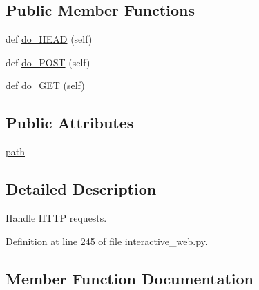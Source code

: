 \subsection*{Public Member Functions}
\begin{DoxyCompactItemize}
\item 
def \hyperlink{classparlai_1_1scripts_1_1interactive__web_1_1MyHandler_a2231328696ebba922f2e5e1d9b8ebb56}{do\+\_\+\+H\+E\+AD} (self)
\item 
def \hyperlink{classparlai_1_1scripts_1_1interactive__web_1_1MyHandler_abea6bbf8b4439489c05a388fa615506c}{do\+\_\+\+P\+O\+ST} (self)
\item 
def \hyperlink{classparlai_1_1scripts_1_1interactive__web_1_1MyHandler_aacb5ca9cbf2a9f2278d3b093e463ec00}{do\+\_\+\+G\+ET} (self)
\end{DoxyCompactItemize}
\subsection*{Public Attributes}
\begin{DoxyCompactItemize}
\item 
\hyperlink{classparlai_1_1scripts_1_1interactive__web_1_1MyHandler_ac1cd1a67cc1ed03620292e70d41125a0}{path}
\end{DoxyCompactItemize}


\subsection{Detailed Description}
\begin{DoxyVerb}Handle HTTP requests.
\end{DoxyVerb}
 

Definition at line 245 of file interactive\+\_\+web.\+py.



\subsection{Member Function Documentation}
\mbox{\label{classparlai_1_1scripts_1_1interactive__web_1_1MyHandler_aacb5ca9cbf2a9f2278d3b093e463ec00}} 
